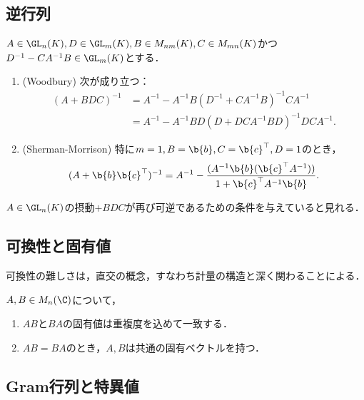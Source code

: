 \documentclass[uplatex, dvipdfmx]{jsreport}
\begin{document}
\subsection{逆行列}

\begin{proposition}
    $A\in \GL_n(K),D\in \GL_m(K),B\in M_{nm}(K),C\in M_{mn}(K)$かつ$D^{-1}-CA^{-1}B\in\GL_m(K)$とする．
    \begin{enumerate}
        \item (Woodbury) 次が成り立つ：
        \begin{align*}
            (A+BDC)^{-1}&=A^{-1}-A^{-1}B(D^{-1}+CA^{-1}B)^{-1}CA^{-1}\\
            &=A^{-1}-A^{-1}BD(D+DCA^{-1}BD)^{-1}DCA^{-1}.
        \end{align*}
        \item (Sherman-Morrison) 特に$m=1,B=\b{b},C=\b{c}^\top,D=1$のとき，
        \[(A+\b{b}\b{c}^\top)^{-1}=A^{-1}-\frac{(A^{-1}\b{b}(\b{c}^\top A^{-1}))}{1+\b{c}^\top A^{-1}\b{b}}.\]
    \end{enumerate}
\end{proposition}
\begin{remarks}
    $A\in\GL_n(K)$の摂動$+BDC$が再び可逆であるための条件を与えていると見れる．
\end{remarks}

\subsection{可換性と固有値}

\begin{tcolorbox}[colframe=ForestGreen, colback=ForestGreen!10!white,breakable,colbacktitle=ForestGreen!40!white,coltitle=black,fonttitle=\bfseries\sffamily,
title=]
    可換性の難しさは，直交の概念，すなわち計量の構造と深く関わることによる．
\end{tcolorbox}

\begin{theorem}
    $A,B\in M_n(\C)$について，
    \begin{enumerate}
        \item $AB$と$BA$の固有値は重複度を込めて一致する．
        \item $AB=BA$のとき，$A,B$は共通の固有ベクトルを持つ．
    \end{enumerate}
\end{theorem}

\subsection{Gram行列と特異値}
\end{document}
